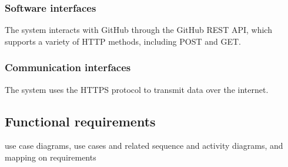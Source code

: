 \documentclass{article}
\begin{document}
        \subsubsection{Software interfaces}
            The system interacts with GitHub through the GitHub REST API, which supports a variety of HTTP methods, including POST and GET.      
        \subsubsection{Communication interfaces}
            The system uses the HTTPS protocol to transmit data over the internet.
    \subsection{Functional requirements}
        use case diagrams, use cases and related sequence and activity diagrams, and mapping on requirements
\end{document}
